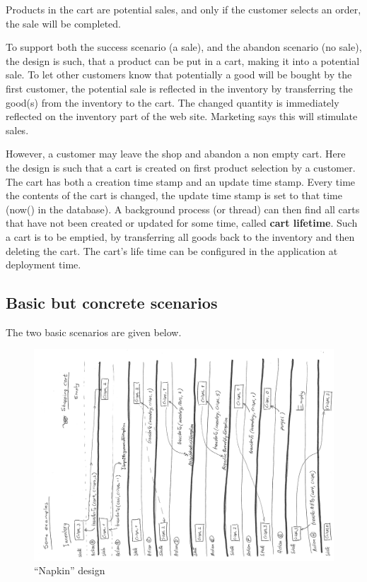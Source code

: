 Products in the cart are potential sales, and only if the
customer selects an order, the sale will be completed.

To support both the success scenario (a sale), and the abandon
scenario (no sale), the design is such, that a product can be put in a
cart, making it 
into a potential sale. To let other customers know that
potentially a good will be bought by the first customer, the
potential sale is reflected in the inventory by transferring the
good(s) from the inventory to the cart. The changed quantity is
immediately reflected on the inventory part of the web site. Marketing
says this will stimulate sales. 

However, a customer may leave the shop and abandon a non empty cart.
Here the design is such that a cart is created on first product
selection by a customer. The cart has both a creation time stamp and
an update time stamp. Every time the contents of the cart is changed,
the update time stamp is set to that time (now() in the database).
A background process (or thread) can then find all carts that have not
been created or updated for some time, called \textbf{cart lifetime}.
Such a cart is to be emptied, by transferring all goods back to the 
inventory and then deleting the cart.
The cart's life time can be configured in the application at deployment time. 
\subsection{Basic but concrete scenarios}

The two basic scenarios are given below.
{\scriptsize

}

{\scriptsize
{}
}

\begin{center}
  \begin{figure}
    \includegraphics[angle=-90,width=\textwidth]{figures/assessment_napkin}
    \caption{\label{fig:napkin} ``Napkin'' design }
  \end{figure}
\end{center}


